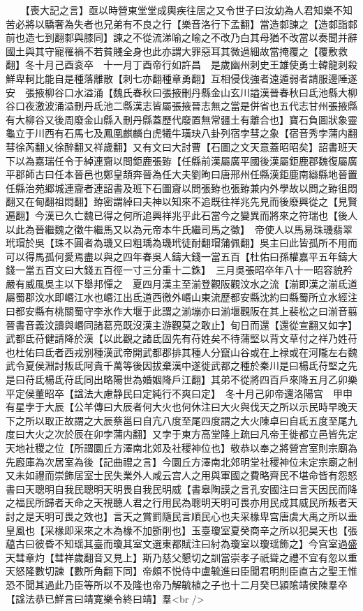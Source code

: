 　　【喪大記之言】亟以時營東堂堂成輿疾往居之又令世子曰汝幼為人君知樂不知苦必將以驕奢為失者也兄弟有不良之行【樂音洛行下孟翻】當造䣛諫之【造䣛詣䣛前也造七到翻䣛與膝同】諫之不從流涕喻之喻之不改乃白其母猶不改當以奏聞并辭國土與其守寵罹禍不若貧賤全身也此亦謂大罪惡耳其微過細故當掩覆之【覆敷救翻】冬十月己酉衮卒　十一月丁酉帝行如許昌　是歲幽州刺史王雄使勇士韓龍刺殺鮮卑軻比能自是種落離散【刺七亦翻種章勇翻】互相侵伐強者遠遁弱者請服邊陲遂安　張掖柳谷口水溢涌【魏氏春秋曰張掖刪丹縣金山玄川謚漢晉春秋曰氐池縣大柳谷口夜激波涌溢刪丹氐池二縣漢志皆屬張掖晉志無之當是併省也五代志甘州張掖縣有大柳谷又後周廢金山縣入刪丹縣蓋歷代廢置無常疆土有離合也】寶石負圖狀象靈龜立于川西有石馬七及鳳凰麒麟白虎犧牛璜玦八卦列宿孛彗之象【宿音秀孛蒲内翻彗徐芮翻乂徐醉翻又祥歲翻】又有文曰大討曹【石圖之文天意蓋昭昭矣】詔書班天下以為嘉瑞任令于綽連齎以問鉅鹿張臶【任縣前漢屬廣平國後漢屬鉅鹿郡魏復屬廣平郡師古曰任本晉邑也鄭皇頡奔晉為任大夫劉昫曰唐邢州任縣漢鉅鹿南䜌縣地晉置任縣治苑郷城連齎者連詔書及班下石圖齎以問張臶也張臶兼内外學故以問之臶徂悶翻又在甸翻祖悶翻】臶密謂綽曰夫神以知來不追既往祥兆先見而後廢興從之【見賢遍翻】今漢已久亡魏已得之何所追興祥兆乎此石當今之變異而將來之符瑞也【後人以此為晉繼魏之徵牛繼馬又以為元帝本牛氏繼司馬之徵】　帝使人以馬易珠璣翡翠玳瑁於吳【珠不圓者為璣又曰粗瑀為璣玳徒耐翻瑁蒲佩翻】吳主曰此皆孤所不用而可以得馬孤何愛焉盡以與之四年春吳人鑄大錢一當五百【杜佑曰孫權嘉平五年鑄大錢一當五百文曰大錢五百徑一寸三分重十二銖】　三月吳張昭卒年八十一昭容貌矜嚴有威風吳主以下舉邦憚之　夏四月漢主至湔登觀阪觀汶水之流【湔即漢之湔氐道屬蜀郡汶水即㟭江水也㟭江出氐道西徼外㟭山東流歷都安縣沈約曰縣蜀所立水經注曰都安縣有桃關蜀守李氷作大堰于此謂之湔塴亦曰湔堰觀阪在其上裴松之曰湔音翦晉書音義汶讀與㟭同諸葛亮既沒漢主游觀莫之敢止】旬日而還【還從宣翻又如字】　武都氐苻健請降於漢【以此觀之諸氐固先有苻姓矣不待蒲堅以背文草付之祥乃姓苻也杜佑曰氐者西戎别種漢武帝開武都郡排其種人分竄山谷或在上禄或在河隴左右魏武令夏侯淵討叛氐阿貴千萬等後因拔棄漢中遂徙武都之種於秦川是曰楊氐苻堅之先是曰苻氐楊氐苻氐同出略陽世為婚姻降戶江翻】其弟不從將四百戶來降五月乙卯樂平定侯董昭卒【諡法大慮静民曰定純行不爽曰定】　冬十月己卯帝還洛陽宫　甲申有星孛于大辰【公羊傳曰大辰者何大火也何休注曰大火與伐天之所以示民時早晚天下之所以取正故謂之大辰蔡邕曰自亢八度至尾四度謂之大火陳卓曰自氐五度至尾九度曰大火之次於辰在卯孛蒲内翻】又孛于東方高堂隆上疏曰凡帝王徙都立邑皆先定天地社稷之位【所謂圜丘方澤南北郊及社稷神位也】敬恭以奉之將營宫室則宗廟為先廏庫為次居室為後【記曲禮之言】今圜丘方澤南北郊明堂社稷神位未定宗廟之制又未如禮而崇飾居室士民失業外人咸云宫人之用與軍國之費略齊民不堪命皆有怨怒書曰天聰明自我民聰明天明畏自我民明威【書皋陶謨之言孔安國注曰言天因民而降之福民所歸者天命之天視聽人君之行用民為聰明天明可畏亦用民成其威民所叛者天討之是天明可畏之效也】言天之賞罰隨民言順民心也夫采椽卑宫唐虞大禹之所以垂皇風也【采椽即采來之木為椽不加斵削也】玉臺瓊室夏癸商辛之所以犯昊天也【張藴古曰彼昏不知瑶其臺而瓊其室文選東都賦注曰紂為瓊室以瓊瑶飾之】今宫室過盛天彗章灼【彗祥歲翻音又見上】斯乃慈父懇切之訓當崇孝子祇聳之禮不宜有忽以重天怒隆數切諫【數所角翻下同】帝頗不悦侍中盧毓進曰臣聞君明則臣直古之聖王惟恐不聞其過此乃臣等所以不及隆也帝乃解毓植之子也十二月癸巳潁隂靖侯陳羣卒【諡法恭已鮮言曰靖寛樂令終曰靖】羣<br />
